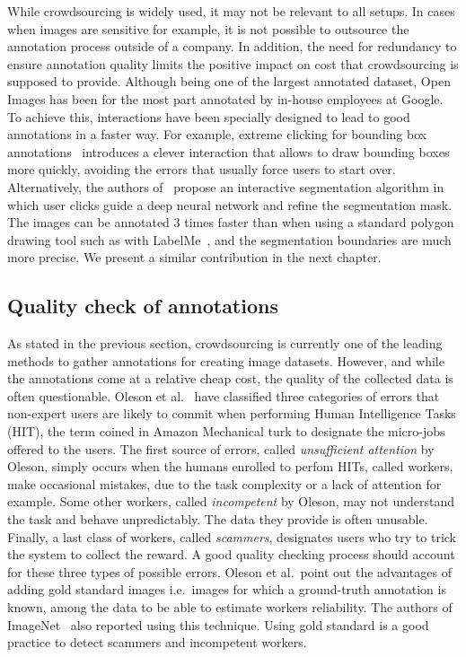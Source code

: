 While crowdsourcing is widely used, it may not be relevant to all setups.
In cases when images are sensitive for example,
it is not possible to outsource the annotation process outside of a company.
In addition, the need for redundancy to ensure annotation quality
limits the positive impact on cost that crowdsourcing is supposed to provide.
Although being one of the largest annotated dataset,
Open Images has been for the most part annotated by in-house employees at Google.
To achieve this, interactions have been specially designed to lead
to good annotations in a faster way.
For example, extreme clicking for bounding box annotations~\cite{papadopoulos2017extreme}
introduces a clever interaction that allows to draw bounding boxes more quickly,
avoiding the errors that usually force users to start over.
Alternatively, the authors of~\cite{OpenImagesSegmentation}
propose an interactive segmentation algorithm in which user clicks
guide a deep neural network and refine the segmentation mask.
The images can be annotated 3 times faster than when
using a standard polygon drawing tool such as with LabelMe~\cite{russell2008labelme},
and the segmentation boundaries are much more precise.
We present a similar contribution in the next chapter.


\subsection{Quality check of annotations}%
\label{sec:annotation_quality}

As stated in the previous section, crowdsourcing is currently one of
the leading methods to gather annotations for creating image datasets.
However, and while the annotations come at a relative cheap cost,
the quality of the collected data is often questionable.
Oleson et al.~\cite{oleson2011programmatic} have classified
three categories of errors that non-expert users are likely to commit
when performing Human Intelligence Tasks
(HIT), the term coined in Amazon Mechanical turk to designate the micro-jobs offered to the users.
The first source of errors, called \textit{unsufficient attention} by Oleson,
simply occurs when the humans enrolled to perfom HITs, called workers,
make occasional mistakes, due to the task complexity or a lack of attention for example.
Some other workers, called \textit{incompetent} by Oleson,
may not understand the task and behave unpredictably.
The data they provide is often unusable.
Finally, a last class of workers, called \textit{scammers},
designates users who try to trick the system to collect the reward.
A good quality checking process should account for these three types of possible errors.
Oleson et al.\ point out the advantages of adding gold standard images
i.e.\ images for which a ground-truth annotation is known,
among the data to be able to estimate workers reliability.
The authors of ImageNet~\cite{ILSVRC15} also reported using this technique.
Using gold standard is a good practice to detect scammers and incompetent workers.

